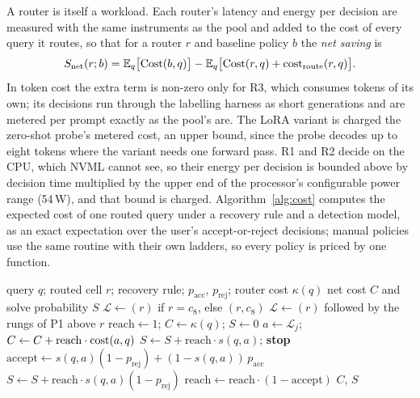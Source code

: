 A router is itself a workload. Each router's latency and energy per decision
are measured with the same instruments as the pool and added to the cost of
every query it routes, so that for a router $r$ and baseline policy $b$ the
\emph{net saving} is
\begin{equation}
  S_{\mathrm{net}}(r; b) =
    \mathbb{E}_q\bigl[\mathrm{Cost}(b, q)\bigr]
  - \mathbb{E}_q\bigl[\mathrm{Cost}(r, q) + \mathrm{cost}_{\mathrm{route}}(r, q)\bigr].
  \label{eq:netsaving}
\end{equation}
In token cost the extra term is non-zero only for R3, which consumes tokens
of its own; its decisions run through the labelling harness as short
generations and are metered per prompt exactly as the pool's are. The LoRA
variant is charged the zero-shot probe's metered cost, an upper bound, since
the probe decodes up to eight tokens where the variant needs one forward
pass. R1 and R2 decide on the CPU, which NVML cannot see, so their energy per
decision is bounded above by decision time multiplied by the upper end of the
processor's configurable power range (54\,W), and that bound is charged.
Algorithm~\ref{alg:cost} computes the expected cost of one routed query under
a recovery rule and a detection model, as an exact expectation over the user's
accept-or-reject decisions; manual policies use the same routine with their
own ladders, so every policy is priced by one function.

\begin{algorithm}[t]
\caption{Expected cost and solve probability of one routed query.}
\label{alg:cost}
\small
\begin{algorithmic}[1]
\Require query $q$; routed cell $r$; recovery rule; $p_{\mathrm{acc}}$,
  $p_{\mathrm{rej}}$; router cost $\kappa(q)$
\Ensure net cost $C$ and solve probability $S$
  \State $\mathcal{L} \gets (r)$ if $r = c_8$, else $(r, c_8)$
\Else
  \State $\mathcal{L} \gets (r)$ followed by the rungs of P1 above $r$
\EndIf
\State $\mathrm{reach} \gets 1$; $C \gets \kappa(q)$; $S \gets 0$
  \State $a \gets \mathcal{L}_j$; $C \gets C + \mathrm{reach}\cdot
    \mathrm{cost}(a, q)$
    \State $S \gets S + \mathrm{reach}\cdot s(q, a)$; \textbf{stop}
  \EndIf
  \State $\mathrm{accept} \gets s(q, a)(1 - p_{\mathrm{rej}}) +
    (1 - s(q, a))\,p_{\mathrm{acc}}$
  \State $S \gets S + \mathrm{reach}\cdot s(q, a)(1 - p_{\mathrm{rej}})$
  \State $\mathrm{reach} \gets \mathrm{reach}\cdot(1 - \mathrm{accept})$
\EndFor
\State \Return $C$, $S$
\end{algorithmic}
\end{algorithm}

